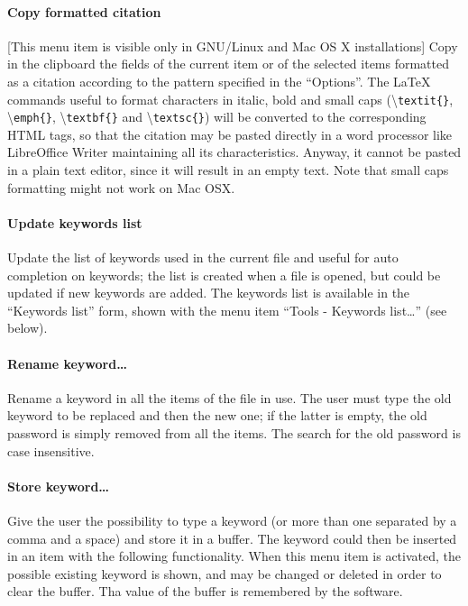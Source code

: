 \documentclass[a4paper,12pt]{report}
\begin{document}
\paragraph{Copy formatted citation} [This menu item is visible only in GNU/Linux and Mac OS X installations] Copy in the clipboard the fields of the current item or of the selected items formatted as a citation according to the pattern specified in the “Options”. The LaTeX commands useful to format characters in italic, bold and small caps (\textbackslash \texttt{textit\{\}}, \textbackslash \texttt{emph\{\}}, \textbackslash \texttt{textbf\{\}} and \textbackslash \texttt{textsc\{\}}) will be converted to the corresponding HTML tags, so that the citation may be pasted directly in a word processor like LibreOffice Writer maintaining all its characteristics. Anyway, it cannot be pasted in a plain text editor, since it will result in an empty text. Note that small caps formatting might not work on Mac OSX.

\paragraph{Update keywords list} Update the list of keywords used in the current file and useful for auto completion on keywords; the list is created when a file is opened, but could be updated if new keywords are added. The keywords list is available in the “Keywords list” form, shown with the menu item “Tools - Keywords list\dots” (see below).

\paragraph{Rename keyword\dots} Rename a keyword in all the items of the file in use. The user must type the old keyword to be replaced and then the new one; if the latter is empty, the old password is simply removed from all the items. The search for the old password is case insensitive.

\paragraph{Store keyword\dots} Give the user the possibility to type a keyword (or more than one separated by a comma and a space) and store it in a buffer. The keyword could then be inserted in an item with the following functionality. When this menu item is activated, the possible existing keyword is shown, and may be changed or deleted in order to clear the buffer. Tha value of the buffer is remembered by the software.
\end{document}
